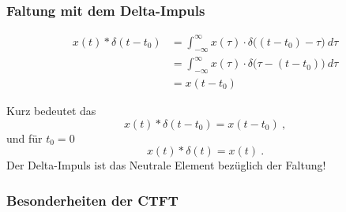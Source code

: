 \documentclass[12pt,a4paper]{scrartcl}
\begin{document}
  \subsubsection{Faltung mit dem Delta-Impuls}
  \label{sec:sub:sub:faltung-mit-delta-impuls}

  \begin{equation}
    \label{eq:10}
    \begin{split}
    x(t) * \delta(t-t_0) &= \int_{-\infty}^{\infty} x(\tau) \cdot \delta\big((t-t_0) - \tau\big)\ d \tau  \\
    &= \int_{-\infty}^{\infty} x(\tau) \cdot \delta \big(\tau -(t-t_0)\big)\ d \tau \\    
    &=x(t - t_0)
    \end{split}
    \end{equation}

\noindent    Kurz bedeutet das
    $$x(t) * \delta(t-t_0) = x(t-t_0)\ ,$$
    und für $t_0 = 0$
    $$x(t) * \delta(t) = x(t)\ .$$
    \noindent Der Delta-Impuls ist das Neutrale Element bezüglich der Faltung!

  \subsubsection{Besonderheiten der CTFT}
  \label{sec:sub:sub:besonderheiten-ctft}
\end{document}
